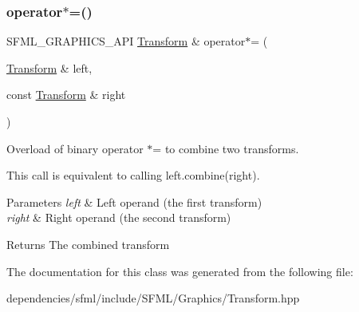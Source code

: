 \subsubsection{\texorpdfstring{operator$\ast$=()}{operator*=()}}
{\footnotesize\ttfamily S\+F\+M\+L\+\_\+\+G\+R\+A\+P\+H\+I\+C\+S\+\_\+\+A\+PI \hyperlink{classsf_1_1_transform}{Transform} \& operator$\ast$= (\begin{DoxyParamCaption}\item[{\hyperlink{classsf_1_1_transform}{Transform} \&}]{left,  }\item[{const \hyperlink{classsf_1_1_transform}{Transform} \&}]{right }\end{DoxyParamCaption})\hspace{0.3cm}{\ttfamily [related]}}



Overload of binary operator $\ast$= to combine two transforms. 

This call is equivalent to calling left.\+combine(right).


\begin{DoxyParams}{Parameters}
{\em left} & Left operand (the first transform) \\
\hline
{\em right} & Right operand (the second transform)\\
\hline
\end{DoxyParams}
\begin{DoxyReturn}{Returns}
The combined transform 
\end{DoxyReturn}


The documentation for this class was generated from the following file\+:\begin{DoxyCompactItemize}
\item 
dependencies/sfml/include/\+S\+F\+M\+L/\+Graphics/Transform.\+hpp\end{DoxyCompactItemize}
